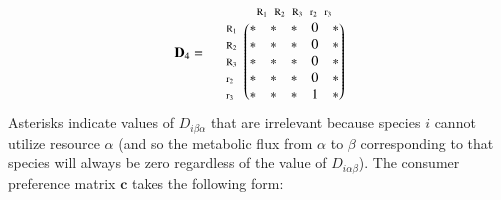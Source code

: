 \documentclass[a4paper,10pt]{article}
\begin{document}
\begin{equation*}
\mathbf{D}_4 = \; \; \; \; \; \begin{matrix}
 & 

\begin{matrix}
\text{\scriptsize $\mathrm{R}_1$} \!\!\! & 
\text{\scriptsize $\mathrm{R}_2$} \!\!\! & 
\text{\scriptsize $\mathrm{R}_3$} \!\!\! & 
\text{\scriptsize $\mathrm{r}_2$} \!\!\! & 
\text{\scriptsize $\mathrm{r}_3$}
\end{matrix}

\\ 

\begin{matrix*}[l]
\text{\scriptsize $\mathrm{R}_1$} \!\!\! \\
\text{\scriptsize $\mathrm{R}_2$} \!\!\! \\
\text{\scriptsize $\mathrm{R}_3$} \!\!\! \\
\text{\scriptsize $\mathrm{r}_2$} \!\!\! \\
\text{\scriptsize $\mathrm{r}_3$} \!\!\!
\end{matrix*}

& 

\begin{pmatrix}
* & * & * & 0 & * \\
* & * & * & 0 & * \\
* & * & * & 0 & * \\
* & * & * & 0 & * \\
* & * & * & 1 & *
\end{pmatrix}

\end{matrix}
\end{equation*}
%
Asterisks indicate values of $D_{i\beta\alpha}$ that are irrelevant because
species $i$ cannot utilize resource $\alpha$ (and so the metabolic flux from
$\alpha$ to $\beta$ corresponding to that species will always be zero
regardless of the value of $D_{i\alpha\beta}$).
The consumer preference matrix $\mathbf{c}$ takes the following form:
\end{document}

